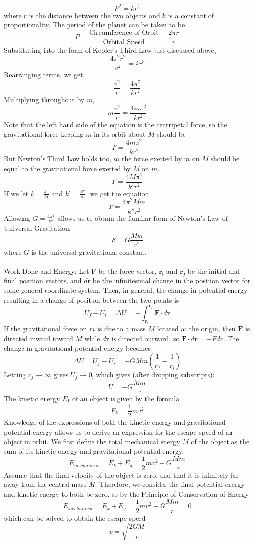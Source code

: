 \documentclass{article}
\begin{document}
$$P^2=kr^3$$
where $r$ is the distance between the two objects and $k$ is a constant of proportionality. The period of the planet can be taken to be
$$P=\frac{\text{Circumference of Orbit}}{\text{Orbital Speed}}=\frac{2\pi r}{v}$$
Substituting into the form of Kepler's Third Law just discussed above,
$$\frac{4\pi ^2r^2}{v^2}=kr^3$$
Rearranging terms, we get
$$\frac{v^2}{r}=\frac{4\pi^2}{kr^2}$$
Multiplying throughout by $m$,
$$m\frac{v^2}{r}=\frac{4m\pi^2}{kr^2}$$
Note that the left hand side of the equation is the centripetal force, so the gravitational force keeping $m$ in its orbit about $M$ should be
$$F=\frac{4m\pi^2}{kr^2}$$
But Newton's Third Law holds too, so the force exerted by $m$ on $M$ should be equal to the gravitational force exerted by $M$ on $m$.
$$F=\frac{4M\pi^2}{k'r^2}$$
If we let $k=\frac{k''}{M}$ and $k'=\frac{k''}{m}$, we get the equation
$$F=\frac{4\pi^2Mm}{k''r^2}$$
Allowing $G=\frac{4\pi^2}{k''}$ allows us to obtain the familiar form of Newton's Law of Universal Gravitation.
$$F=G\frac{Mm}{r^2}$$
where $G$ is the universal gravitational constant.
\\
\\
Work Done and Energy: Let $\textbf{F}$ be the force vector, $\textbf{r}_i$ and $\textbf{r}_f$ be the initial and final position vectors, and $d\textbf{r}$ be the infinitesimal change in the position vector for some general coordinate system. Then, in general, the change in potential energy resulting in a change of position between the two points is 
$$U_f-U_i=\Delta U=-\int_{\textbf{r}_i}^{\textbf{r}_f}\textbf{F}\cdot d\textbf{r}$$
If the gravitational force on $m$ is due to a mass $M$ located at the origin, then $\textbf{F}$ is directed inward toward $M$ while $d\textbf{r}$ is directed outward, so $\textbf{F}\cdot d\textbf{r}=-Fdr$. The change in gravitational potential energy becomes 
$$\Delta U=U_f-U_i=-GMm(\frac{1}{r_f}-\frac{1}{r_i})$$
Letting $r_f\rightarrow\infty$ gives $U_f\rightarrow0$, which gives (after dropping subscripts):
$$U=-G\frac{Mm}{r}$$
The kinetic energy $E_k$ of an object is given by the formula
$$E_k=\frac{1}{2}mv^2$$
Knowledge of the expressions of both the kinetic energy and gravitational potential energy allows us to derive an expression for the escape speed of an object in orbit. We first define the total mechanical energy $M$ of the object as the sum of its kinetic energy and gravitational potential energy.
$$E_{mechanical}=E_k+E_g=\frac{1}{2}mv^2-G\frac{Mm}{r}$$
Assume that the final velocity of the object is zero, and that it is infinitely far away from the central mass $M$. Therefore, we consider the final potential energy and kinetic energy to both be zero, so by the Principle of Conservation of Energy
$$E_{mechanical}=E_k+E_g=\frac{1}{2}mv^2-G\frac{Mm}{r}=0$$
which can be solved to obtain the escape speed
$$v=\sqrt{\frac{2GM}{r}}$$
\end{document}
